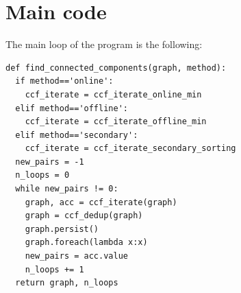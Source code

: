 \documentclass[a4paper,12pt]{article}
\begin{document}
\section{Main code}
\label{pos:mainloop}
The main loop of the program is the following:
\begin{verbatim}
def find_connected_components(graph, method):
  if method=='online':
    ccf_iterate = ccf_iterate_online_min
  elif method=='offline':
    ccf_iterate = ccf_iterate_offline_min
  elif method=='secondary':
    ccf_iterate = ccf_iterate_secondary_sorting
  new_pairs = -1
  n_loops = 0
  while new_pairs != 0:
    graph, acc = ccf_iterate(graph)
    graph = ccf_dedup(graph)
    graph.persist()
    graph.foreach(lambda x:x)
    new_pairs = acc.value
    n_loops += 1
  return graph, n_loops
\end{verbatim}



\end{document}
